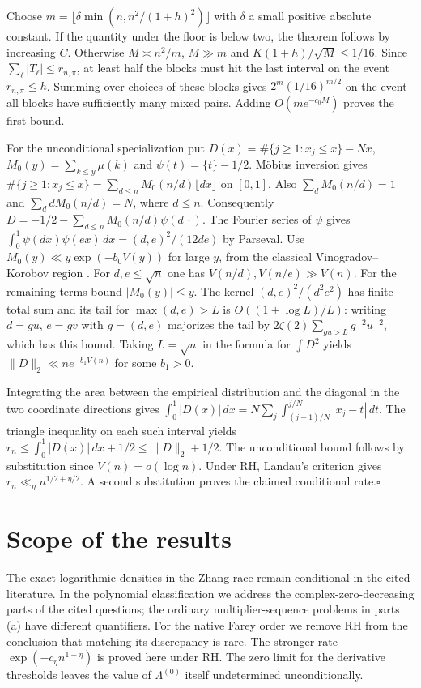 \documentclass[11pt,a4paper]{article}
\begin{document}
Choose $m=\lfloor\delta\min(n,n^2/(1+h)^2)\rfloor$ with $\delta$
a small positive absolute constant. If the quantity under the floor
is below two, the theorem follows by increasing $C$. Otherwise
$M\asymp n^2/m$, $M\gg m$ and $K(1+h)/\sqrt M\le1/16$.
Since $\sum_\ell |T_\ell|\le r_{n,\pi}$, at least half the blocks
must hit the last interval on the event $r_{n,\pi}\le h$.
Summing over choices of these blocks gives
$2^m(1/16)^{m/2}$ on the event all blocks have sufficiently many
mixed pairs. Adding $O(me^{-c_0M})$ proves the first bound.

For the unconditional specialization put
$D(x)=\#\{j\ge1:x_j\le x\}-Nx$, $M_0(y)=\sum_{k\le y}\mu(k)$ and
$\psi(t)=\{t\}-1/2$. M\"obius inversion gives
$\#\{j\ge1:x_j\le x\}=\sum_{d\le n}M_0(n/d)\lfloor dx\rfloor$
on $[0,1]$. Also $\sum_d M_0(n/d)=1$ and $\sum_d dM_0(n/d)=N$,
where $d\le n$. Consequently $D=-1/2-\sum_{d\le n}M_0(n/d)\psi(d\,\cdot)$.
The Fourier series of $\psi$ gives
$\int_0^1\psi(dx)\psi(ex)\,dx=(d,e)^2/(12de)$ by Parseval.
Use $M_0(y)\ll y\exp(-b_0V(y))$ for large $y$, from the classical
Vinogradov--Korobov region \cite{leongmertens}. For $d,e\le\sqrt n$
one has $V(n/d),V(n/e)\gg V(n)$. For the remaining terms bound
$|M_0(y)|\le y$. The kernel $(d,e)^2/(d^2e^2)$ has finite total sum
and its tail for $\max(d,e)>L$ is $O((1+\log L)/L)$: writing
$d=gu$, $e=gv$ with $g=(d,e)$ majorizes the tail by
$2\zeta(2)\sum_{gu>L}g^{-2}u^{-2}$, which has this bound.
Taking $L=\sqrt n$ in the formula for $\int D^2$ yields
$\|D\|_2\ll n e^{-b_1 V(n)}$ for some $b_1>0$.

Integrating the area between the empirical distribution and the
diagonal in the two coordinate directions gives
$\int_0^1|D(x)|\,dx=N\sum_j\int_{(j-1)/N}^{j/N}|x_j-t|\,dt$.
The triangle inequality on each such interval yields
$r_n\le \int_0^1|D(x)|\,dx+1/2\le\|D\|_2+1/2$.
The unconditional bound follows by substitution since $V(n)=o(\log n)$.
Under RH, Landau's criterion \cite{landau1924} gives
$r_n\ll_\eta n^{1/2+\eta/2}$. A second substitution proves the
claimed conditional rate.\hfill$\square$


\section*{Scope of the results}
The exact logarithmic densities in the Zhang race remain conditional
in the cited literature. In the polynomial classification we address
the complex-zero-decreasing parts of the cited questions; the ordinary
multiplier-sequence problems in parts (a) have different quantifiers.
For the native Farey order we remove RH from the conclusion that
matching its discrepancy is rare. The stronger rate
$\exp(-c_\eta n^{1-\eta})$ is proved here under RH.
The zero limit for the derivative thresholds leaves the value of
$\Lambda^{(0)}$ itself undetermined unconditionally.
\end{document}

